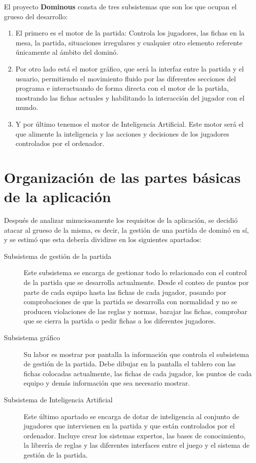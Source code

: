 El proyecto \textbf{Dominous} consta de tres subsistemas que son los que ocupan el grueso del desarrollo:
\begin{enumerate}
    \item El primero es el motor de la partida: Controla los jugadores, las fichas en la mesa, la partida, situaciones irregulares
            y cualquier otro elemento referente únicamente al ámbito del dominó.
    \item Por otro lado está el motor gráfico, que será la interfaz entre la partida y el usuario, permitiendo el movimiento
            fluido por las diferentes secciones del programa e interactuando de forma directa con el motor de la partida,
            mostrando las fichas actuales y habilitando la interacción del jugador con el mundo.
    \item Y por último tenemos el motor de Inteligencia Artificial. Este motor será el que alimente la inteligencia
            y las acciones y decisiones de los jugadores controlados por el ordenador.
\end{enumerate}

\section{Organización de las partes básicas de la aplicación}

Después de analizar minuciosamente los requisitos de la aplicación, se decidió atacar al grueso de la misma,
es decir, la gestión de una partida de dominó en sí, y se estimó que esta debería dividirse en los siguientes
apartados:

\begin{description}
    \item[Subsistema de gestión de la partida] Este subsistema se encarga de gestionar todo lo relacionado
            con el control de la partida que se desarrolla actualmente. Desde el conteo de puntos por parte
            de cada equipo hasta las fichas de cada jugador, pasando por comprobaciones de que la partida
            se desarrolla con normalidad y no se producen violaciones de las reglas y normas, barajar las
            fichas, comprobar que se cierra la partida o pedir fichas a los diferentes jugadores.
    \item[Subsistema gráfico] Su labor es mostrar por pantalla la información que controla el subsistema
            de gestión de la partida. Debe dibujar en la pantalla el tablero con las fichas colocadas
            actualmente, las fichas de cada jugador, los puntos de cada equipo y demás información que
            sea necesario mostrar.
    \item[Subsistema de Inteligencia Artificial] Este último apartado se encarga de dotar de inteligencia al
            conjunto de jugadores que intervienen en la partida y que están controlados por el ordenador. Incluye
            crear los sistemas expertos, las bases de conocimiento, la librería de reglas y las diferentes
            interfaces entre el juego y el sistema de gestión de la partida.
\end{description}

